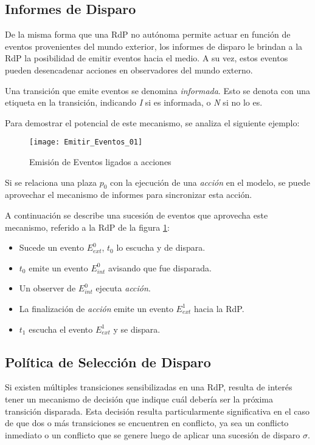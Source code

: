 \subsection{Informes de Disparo}

De la misma forma que una RdP no autónoma permite actuar en función de eventos
provenientes del mundo exterior, los informes de disparo le brindan a la RdP la
posibilidad de emitir eventos hacia el medio. A su vez, estos eventos pueden
desencadenar acciones en observadores del mundo externo.

Una transición que emite eventos se denomina \textit{informada}.
Esto se denota con una etiqueta en la transición, indicando \textit{I} si es
informada, o \textit{N} si no lo es.

Para demostrar el potencial de este mecanismo, se analiza el siguiente ejemplo:

\begin{figure}[h]
  \centering
  \texttt{[image: Emitir\_Eventos\_01]}
  \caption{Emisión de Eventos ligados a acciones}
  \label{fig:eventos01}
\end{figure}

Si se relaciona una plaza $p_{0}$ con la ejecución de una
\textit{acción} en el modelo, se puede aprovechar el mecanismo
de informes para sincronizar esta acción.

A continuación se describe una sucesión de eventos que aprovecha este
mecanismo, referido a la RdP de la figura \ref{fig:eventos01}:
\begin{itemize}
  \item Sucede un evento $E_{ext}^{0}$, $t_{0}$ lo escucha y de dispara.
  \item $t_{0}$ emite un evento $E_{int}^{0}$ avisando que fue disparada.
  \item Un observer de $E_{int}^{0}$ ejecuta \textit{acción}.
  \item La finalización de \textit{acción} emite un evento
  $E_{ext}^{1}$ hacia la RdP.
  \item $t_{1}$ escucha el evento $E_{ext}^{1}$ y se dispara.
\end{itemize}

\subsection{Política de Selección de Disparo}

Si existen múltiples transiciones sensibilizadas en una RdP, resulta de interés
tener un mecanismo de decisión que indique cuál debería ser la próxima
transición disparada.
Esta decisión resulta particularmente significativa en el caso de que dos o más
transiciones se encuentren en conflicto, ya sea un conflicto inmediato o un
conflicto que se genere luego de aplicar una sucesión de disparo $\sigma$.

